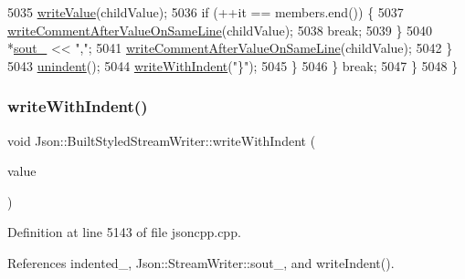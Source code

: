 \begin{DoxyCode}
5035         \hyperlink{struct_json_1_1_built_styled_stream_writer_a7c9da861861e570a51b45f270c9ff150}{writeValue}(childValue);
5036         \textcolor{keywordflow}{if} (++it == members.end()) \{
5037           \hyperlink{struct_json_1_1_built_styled_stream_writer_a89625b134fce0255263ca40e6125742b}{writeCommentAfterValueOnSameLine}(childValue);
5038           \textcolor{keywordflow}{break};
5039         \}
5040         *\hyperlink{class_json_1_1_stream_writer_a4f5603d4228a9fa46a42cb44e5234d9b}{sout\_} << \textcolor{stringliteral}{","};
5041         \hyperlink{struct_json_1_1_built_styled_stream_writer_a89625b134fce0255263ca40e6125742b}{writeCommentAfterValueOnSameLine}(childValue);
5042       \}
5043       \hyperlink{struct_json_1_1_built_styled_stream_writer_a0da6c6f603e00c8c6e38af553edd8c55}{unindent}();
5044       \hyperlink{struct_json_1_1_built_styled_stream_writer_a6e80e1a0d5f64df2ec48c3c3b1284990}{writeWithIndent}(\textcolor{stringliteral}{"\}"});
5045     \}
5046   \} \textcolor{keywordflow}{break};
5047   \}
5048 \}
\end{DoxyCode}
\mbox{\label{struct_json_1_1_built_styled_stream_writer_a6e80e1a0d5f64df2ec48c3c3b1284990}} 
\subsubsection{\texorpdfstring{write\+With\+Indent()}{writeWithIndent()}}
{\footnotesize\ttfamily void Json\+::\+Built\+Styled\+Stream\+Writer\+::write\+With\+Indent (\begin{DoxyParamCaption}\item[{\hyperlink{json_8h_a1e723f95759de062585bc4a8fd3fa4be}{J\+S\+O\+N\+C\+P\+P\+\_\+\+S\+T\+R\+I\+NG} const \&}]{value }\end{DoxyParamCaption})\hspace{0.3cm}{\ttfamily [private]}}



Definition at line 5143 of file jsoncpp.\+cpp.



References indented\+\_\+, Json\+::\+Stream\+Writer\+::sout\+\_\+, and write\+Indent().



